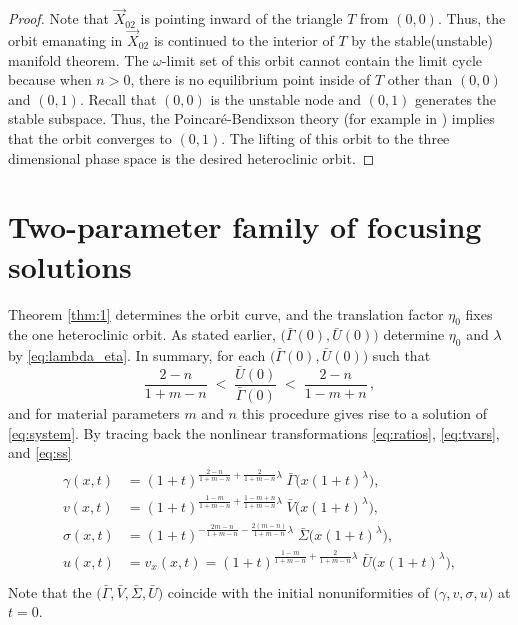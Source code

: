 \documentclass[a4paper,11pt]{article}
\def\red{\color{red}}
\def\red{\color{red}}
\def\bG{\bar{\Gamma}}
\def\bS{\bar{\Sigma}}
\def\bV{\bar{V}}
\def\bU{\bar{U}}
\numberwithin{step}{dummy}
\begin{document}
\begin{proof}
Note that $\vec{X}_{02}$ is pointing inward of the triangle $T$ from $(0,0)$. Thus, the orbit emanating in $\vec{X}_{02}$ is continued to the interior of $T$ by the stable(unstable) manifold theorem. The $\omega$-limit set of this orbit cannot contain the limit cycle because when $n>0$, there is no equilibrium point inside of $T$ other than $(0,0)$ and $(0,1)$.  Recall that $(0,0)$ is the unstable node and $(0,1)$ generates the stable subspace. Thus, the Poincar\'e-Bendixson theory (for example in \cite{perko_differential_2001}) implies that the orbit converges to $(0,1)$.  The lifting of this orbit to the three dimensional phase space is the desired heteroclinic orbit. %
\end{proof}

\section{Two-parameter family of focusing solutions}
Theorem \ref{thm:1} determines the orbit curve, and the translation factor $\eta_0$ fixes the one heteroclinic orbit. As stated earlier, $\big(\bG(0),\bU(0)\big)$ determine $\eta_0$ and $\lambda$  by \eqref{eq:lambda_eta}. In summary, for each $\big(\bG(0),\bU(0)\big)$ such that
\begin{equation*}
 \frac{2-n}{1+m-n} \;<\; \frac{\bU(0)}{\bG(0)} \;<\; \frac{2-n}{1-m+n} \, ,
\end{equation*}
and for material parameters $m$ and $n$ this procedure gives rise to a solution of \eqref{eq:system}. By tracing back the nonlinear transformations \eqref{eq:ratios}, \eqref{eq:tvars}, and \eqref{eq:ss}
\begin{align}
 \begin{aligned}
 \gamma(x,t) &= (1 + t)^{ \frac{2-n}{1+m-n}+ \frac{ 2 }{1+m-n}\lambda } \;\bG\Big(x(1 + t)^{\lambda}\Big), \\
 v(x,t) &= (1 + t)^{ \frac{1-m}{1+m-n}+ \frac{ 1-m+n }{1+m-n}\lambda } \;\bV\Big(x(1 + t)^{\lambda}\Big), \\
 \sigma(x,t) &= (1 + t)^{ -\frac{2m-n}{1+m-n} - \frac{ 2(m-n) }{1+m-n}\lambda } \;\bS\Big(x(1 + t)^{\lambda}\Big), \\
 u(x,t) &=   v_x (x,t)  = (1 + t)^{\frac{1-m}{1+m-n}+ \frac{ 2 }{1+m-n}\lambda} \;\bU\Big(x(1 + t)^{\lambda}\Big), \\
 \end{aligned} \label{eq:sssol}
\end{align}
Note that the $\big(\bG,\bV,\bS,\bU\big)$ coincide with the initial nonuniformities of $\big(\gamma,v,\sigma,u\big)$ at $t=0$. 
\end{document}
